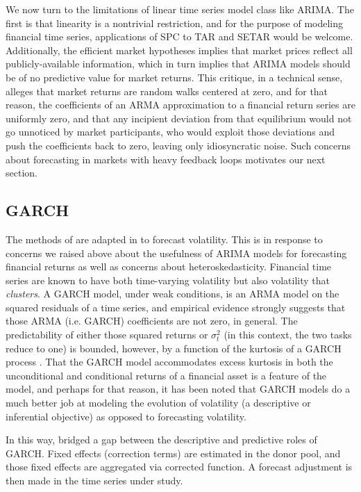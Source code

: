 \documentclass[11pt]{article}
\theoremstyle{definition}
\begin{document}
We now turn to the limitations of linear time series model class like ARIMA.  The first is that linearity is a nontrivial restriction, and for the purpose of modeling financial time series, applications of SPC to TAR and SETAR would be welcome.  Additionally, the efficient market hypotheses implies that market prices reflect all publicly-available information, which in turn implies that ARIMA models should be of no predictive value for market returns.  This critique, in a technical sense, alleges that market returns are random walks centered at zero, and for that reason, the coefficients of an ARMA approximation to a financial return series are uniformly zero, and that any incipient deviation from that equilibrium would not go unnoticed by market participants, who would exploit those deviations and push the coefficients back to zero, leaving only idiosyncratic noise.  Such concerns about forecasting in markets with heavy feedback loops motivates our next section.
\subsection{GARCH}
The methods of \cite{lin2021minimizing} are adapted in \cite{lundquist2024volatility} to forecast volatility.  This is in response to concerns we raised above about the usefulness of ARIMA models for forecasting financial returns as well as concerns about heteroskedasticity.  Financial time series are known to have both time-varying volatility but also volatility that \textit{clusters}.  A GARCH model, under weak conditions, is an ARMA model on the squared residuals of a time series, and empirical evidence strongly suggests that those ARMA (i.e. GARCH) coefficients are not zero, in general.  The predictability of either those squared returns or $\sigma_{t}^{2}$ (in this context, the two tasks reduce to one) is bounded, however, by a function of the kurtosis of a GARCH process \citep{francq2019garch}.  That the GARCH model accommodates excess kurtosis in both the unconditional and conditional returns of a financial asset is a feature of the model, and perhaps for that reason, it has been noted that GARCH models do a much better job at modeling the evolution of volatility (a descriptive or inferential objective) as opposed to forecasting volatility.

In this way, \cite{lundquist2024volatility} bridged a gap between the descriptive and predictive roles of GARCH.  Fixed effects (correction terms) are estimated in the donor pool, and those fixed effects are aggregated via corrected function.  A forecast adjustment is then made in the time series under study.
\end{document}
